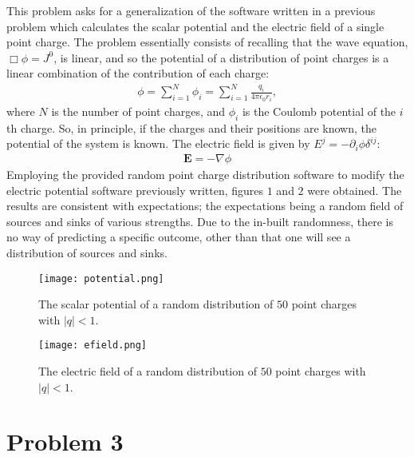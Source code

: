 \documentclass[letter,12pt]{article}
\begin{document}
This problem asks for a generalization of the software written in a previous problem which calculates the scalar potential and the electric field of a single point charge. The problem essentially consists of recalling that the wave equation, $\Box \phi = J^0$, is linear, and so the potential of a distribution of point charges is a linear combination of the contribution of each charge:
\begin{align}
\phi = \sum_{i=1}^N \phi_i = \sum_{i=1}^N \frac{q_i}{4\pi \epsilon_0 r_i},
\end{align}
where $N$ is the number of point charges, and $\phi_i$ is the Coulomb potential of the $i$th charge. So, in principle, if the charges and their positions are known, the potential of the system is known. The electric field is given by $E^j = -\partial_i \phi \delta^{ij}$:
\begin{align}
\mathbf{E} = -\nabla \phi
\end{align}
Employing the provided random point charge distribution software to modify the electric potential software previously written, figures $1$ and $2$ were obtained. The results are consistent with expectations; the expectations being a random field of sources and sinks of various strengths. Due to the in-built randomness, there is no way of predicting a specific outcome, other than that one will see a distribution of sources and sinks. 

\begin{figure}[htbp]
    \centering
    \texttt{[image: potential.png]}
    \caption{The scalar potential of a random distribution of $50$ point charges with $|q|<1$.}
\end{figure}

\begin{figure}[htbp]
    \centering
    \texttt{[image: efield.png]}
    \caption{The electric field of a random distribution of $50$ point charges with $|q|<1$.}
\end{figure}

\section{Problem 3}
\end{document}
